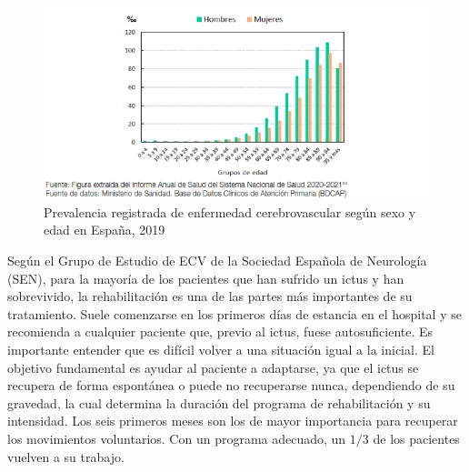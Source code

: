 \begin{figure}[ht!]
	\centering
	\begin{minipage}{0.95\linewidth}
		\centering
		\includegraphics[width=\linewidth]{figs/edad_ictus_es.png}
	\end{minipage}
	\caption{Prevalencia registrada de enfermedad cerebrovascular según sexo y edad en España, 2019}
	\label{fig:grafica}
\end{figure}

Según el Grupo de Estudio de ECV de la Sociedad Española de Neurología (SEN), para la mayoría de los pacientes que han sufrido un ictus y han sobrevivido, la rehabilitación es una de las partes más importantes de su tratamiento.
Suele comenzarse en los primeros días de estancia en el hospital y se recomienda a cualquier paciente que, previo al ictus, fuese autosuficiente.
Es importante entender que es difícil volver a una situación igual a la inicial.
El objetivo fundamental es ayudar al paciente a adaptarse, ya que el ictus se recupera de forma espontánea o puede no recuperarse nunca, dependiendo de su gravedad, la cual determina la duración del programa de rehabilitación y su intensidad.
Los seis primeros meses son los de mayor importancia para recuperar los movimientos voluntarios.
Con un programa adecuado, un $1/3$ de los pacientes vuelven a su trabajo.


